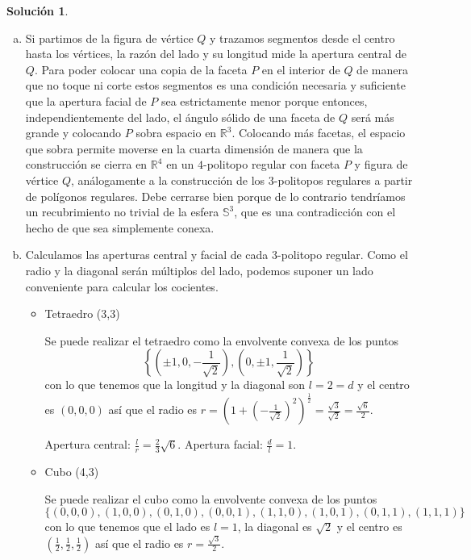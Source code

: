 \documentclass[10pt]{article}
\theoremstyle{definition}
\newtheorem*{sol}{Solución}
\begin{document}
\begin{sol}\leavevmode
\begin{enumerate}[(a)]
\item Si partimos de la figura de vértice $Q$ y trazamos segmentos desde el centro hasta los vértices, la razón del lado y su longitud mide la apertura central de $Q$. Para poder colocar una copia de la faceta $P$ en el interior de $Q$ de manera que no toque ni corte estos segmentos es una condición necesaria y suficiente que la apertura facial de $P$ sea estrictamente menor porque entonces, independientemente del lado, el ángulo sólido de una faceta de $Q$ será más grande y colocando $P$ sobra espacio en $\mathbb{R}^3$. Colocando más facetas, el espacio que sobra permite moverse en la cuarta dimensión de manera que la construcción se cierra en $\mathbb{R}^4$ en un $4$-politopo regular con faceta $P$ y figura de vértice $Q$, análogamente a la construcción de los $3$-politopos regulares a partir de polígonos regulares. Debe cerrarse bien porque de lo contrario tendríamos un recubrimiento no trivial de la esfera $\mathbb{S}^3$, que es una contradicción con el hecho de que sea simplemente conexa.
\item Calculamos las aperturas central y facial de cada $3$-politopo regular. Como el radio y la diagonal serán múltiplos del lado, podemos suponer un lado conveniente para calcular los cocientes.
\begin{itemize}
    \item Tetraedro (3,3)
    
    Se puede realizar el tetraedro como la envolvente convexa de los puntos \[\left\{\left(\pm 1,0,-\frac{1}{\sqrt{2}}\right),\left(0,\pm 1,\frac{1}{\sqrt{2}}\right)\right\}\] con lo que tenemos que la longitud y la diagonal son $l=2=d$ y el centro es $(0,0,0)$ así que el radio es $r=\left(1+\left(-\frac{1}{\sqrt{2}}\right)^2\right)^\frac{1}{2}=\frac{\sqrt{3}}{\sqrt{2}}=\frac{\sqrt{6}}{2}$.
    
    Apertura central: $\frac{l}{r}=\frac{2}{3}\sqrt{6}$.
    Apertura facial: $\frac{d}{l}=1$.
    
    \item Cubo (4,3)
    
    Se puede realizar el cubo como la envolvente convexa de los puntos \[\{(0,0,0),(1,0,0),(0,1,0),(0,0,1),(1,1,0),(1,0,1),(0,1,1),(1,1,1)\}\]
    con lo que tenemos que el lado es $l=1$, la diagonal es $\sqrt{2}$ y el centro es $\left(\frac{1}{2},\frac{1}{2},\frac{1}{2}\right)$ así que el radio es $r=\frac{\sqrt{3}}{2}.$
    

\end{itemize}
\end{enumerate}
\end{sol}
\end{document}
